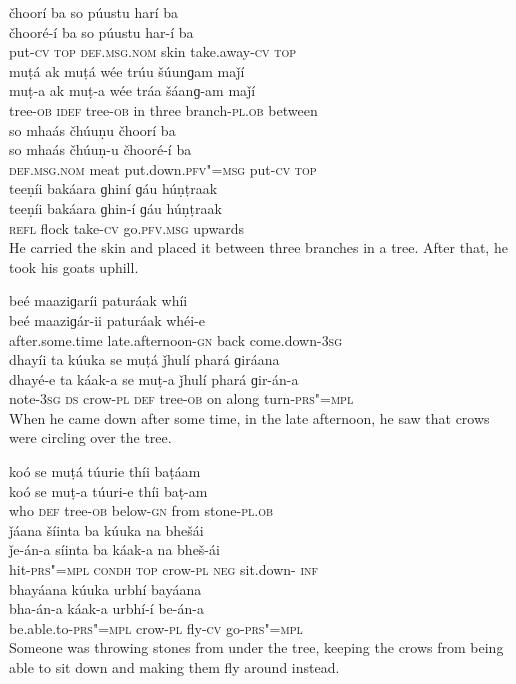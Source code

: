 \begin{exe}
\ex
\label{ex:8}
\glll čhoorí	ba	so	púustu	harí	ba \\
čhooré-í	ba	so	púustu	har-í	ba \\
put-\textsc{cv} \textsc{top} \textsc{def.msg.nom}	skin	take.away-\textsc{cv}   \textsc{top} \\
\glll muṭá	ak	muṭá	wée	trúu	šúunɡam	maǰí \\
muṭ-a	ak	muṭ-a	wée	tráa	šáanɡ-am	maǰí \\
tree-\textsc{ob} \textsc{idef}	tree-\textsc{ob}	in	three	branch-\textsc{pl.ob}	between \\
\glll so	mhaás	čhúuṇu	čhoorí	ba \\
so	mhaás	čhúuṇ-u	čhooré-í	ba \\
\textsc{def.msg.nom}	meat	put.down.\textsc{pfv"=msg}	put-\textsc{cv} \textsc{top} \\
\glll teeṇíi	bakáara	ɡhiní	ɡáu	húṇṭraak \\
teeṇíi	bakáara	ɡhin-í	ɡáu	húṇṭraak \\
\textsc{refl}	flock	take-\textsc{cv}	go.\textsc{pfv.msg}	upwards \\
\glt He carried the skin and placed it between three branches in a tree. After that, he took his goats uphill.

\ex
\label{ex:9}
\glll beé	maaziɡaríi	paturáak	whíi \\
beé	maaziɡár-ii	paturáak	whéi-e \\
after.some.time	late.afternoon-\textsc{gn}	back	come.down-\textsc{3sg} \\
\glll dhayíi	ta	kúuka	se	muṭá	ǰhulí	phará ɡiráana \\
dhayé-e	ta	káak-a	se	muṭ-a	ǰhulí	phará ɡir-án-a \\
note-\textsc{3sg}  \textsc{ds}	crow-\textsc{pl} \textsc{def}	tree-\textsc{ob}	on	along turn-\textsc{prs"=mpl} \\
\glt When he came down after some time, in the late afternoon, he saw that crows were circling over the tree.

\ex
\label{ex:10}
\glll koó	se	muṭá	túurie	thíi	baṭáam \\
koó	se	muṭ-a	túuri-e	thíi	baṭ-am \\
who	\textsc{def}	tree-\textsc{ob}	below-\textsc{gn}	from	stone-\textsc{pl.ob} \\
\glll ǰáana	šíinta	ba	kúuka	na	bhešái \\
ǰe-án-a	síinta	ba	káak-a	na	bheš-ái \\
hit-\textsc{prs"=mpl} \textsc{condh} \textsc{top}	crow-\textsc{pl} \textsc{neg}	sit.down- \textsc{inf} \\
\glll bhayáana	kúuka	urbhí	bayáana \\
bha-án-a	káak-a	urbhí-í	be-án-a \\
be.able.to-\textsc{prs"=mpl}	crow-\textsc{pl}	fly-\textsc{cv}	go-\textsc{prs"=mpl} \\
\glt Someone was throwing stones from under the tree, keeping the crows from being able to sit down and making them fly around instead.


\end{exe}
